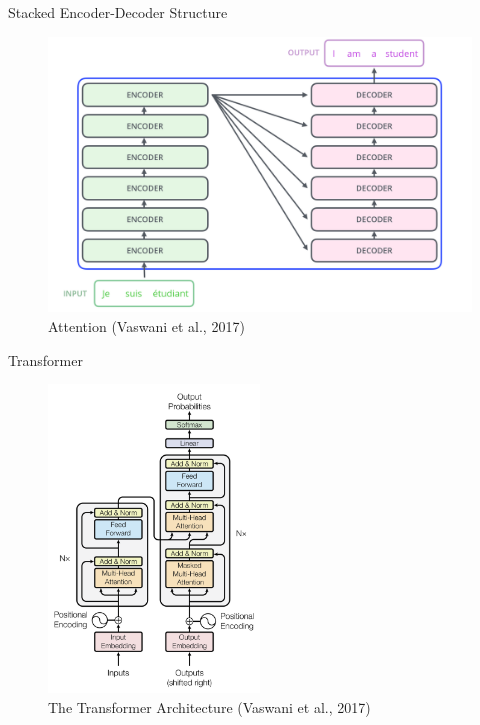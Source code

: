 \documentclass[10pt]{beamer}
\begin{document}
\begin{frame}{Stacked Encoder-Decoder Structure}

\begin{figure}[h]
\centering
\includegraphics[width=1\textwidth]{fig/alammar_The_transformer_encoder_decoder_stack}
\caption{Attention (Vaswani et al., 2017)}
\end{figure}

\end{frame}


\begin{frame}{Transformer}

\begin{figure}[h]
\centering
\includegraphics[width=0.5\textwidth]{fig/Vaswani_1_transformer.png}
\caption{The Transformer Architecture (Vaswani et al., 2017)}
\end{figure}



\end{frame}
\end{document}
